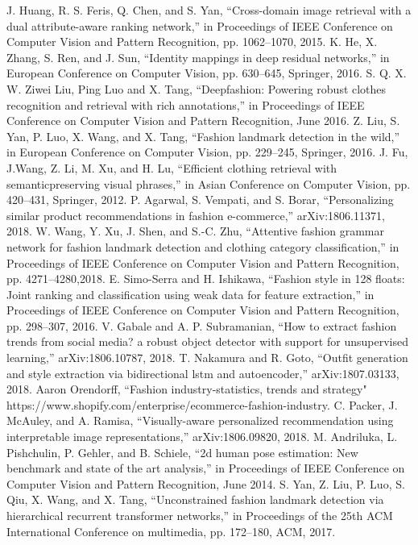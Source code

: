 \documentclass[conference]{IEEEtran}
\begin{document}
\begin{thebibliography}{00}
 J. Huang, R. S. Feris, Q. Chen, and S. Yan, “Cross-domain image retrieval with
a dual attribute-aware ranking network,” in Proceedings of IEEE Conference on Computer Vision and Pattern Recognition, pp. 1062–1070, 2015.
 K. He, X. Zhang, S. Ren, and J. Sun, “Identity mappings in deep residual networks,”
in European Conference on Computer Vision, pp. 630–645, Springer, 2016. 
 S. Q. X. W. Ziwei Liu, Ping Luo and X. Tang, “Deepfashion: Powering robust
clothes recognition and retrieval with rich annotations,” in Proceedings of IEEE
Conference on Computer Vision and Pattern Recognition, June 2016.
 Z. Liu, S. Yan, P. Luo, X. Wang, and X. Tang, “Fashion landmark detection in the
wild,” in European Conference on Computer Vision, pp. 229–245, Springer, 2016.
J. Fu, J.Wang, Z. Li, M. Xu, and H. Lu, “Efficient clothing retrieval with semanticpreserving
visual phrases,” in Asian Conference on Computer Vision, pp. 420–431,
Springer, 2012.
 P. Agarwal, S. Vempati, and S. Borar, “Personalizing similar product recommendations
in fashion e-commerce,” arXiv:1806.11371, 2018. 
 W. Wang, Y. Xu, J. Shen, and S.-C. Zhu, “Attentive fashion grammar network for
fashion landmark detection and clothing category classification,” in Proceedings
of IEEE Conference on Computer Vision and Pattern Recognition, pp. 4271–4280,2018.
 E. Simo-Serra and H. Ishikawa, “Fashion style in 128 floats: Joint ranking and
classification using weak data for feature extraction,” in Proceedings of IEEE Conference
on Computer Vision and Pattern Recognition, pp. 298–307, 2016.
 V. Gabale and A. P. Subramanian, “How to extract fashion trends from social
media? a robust object detector with support for unsupervised learning,”
arXiv:1806.10787, 2018.
 T. Nakamura and R. Goto, “Outfit generation and style extraction via bidirectional
lstm and autoencoder,” arXiv:1807.03133, 2018.
  Aaron Orendorff, “Fashion industry-statistics, trends and strategy" https://www.shopify.com/enterprise/ecommerce-fashion-industry.
 C. Packer, J. McAuley, and A. Ramisa, “Visually-aware personalized recommendation
using interpretable image representations,” arXiv:1806.09820, 2018.
 M. Andriluka, L. Pishchulin, P. Gehler, and B. Schiele, “2d human pose estimation:
New benchmark and state of the art analysis,” in Proceedings of IEEE Conference
on Computer Vision and Pattern Recognition, June 2014.
S. Yan, Z. Liu, P. Luo, S. Qiu, X. Wang, and X. Tang, “Unconstrained fashion landmark detection via hierarchical recurrent transformer networks,” in Proceedings of
the 25th ACM International Conference on multimedia, pp. 172–180, ACM, 2017.


\end{thebibliography}
\end{document}
